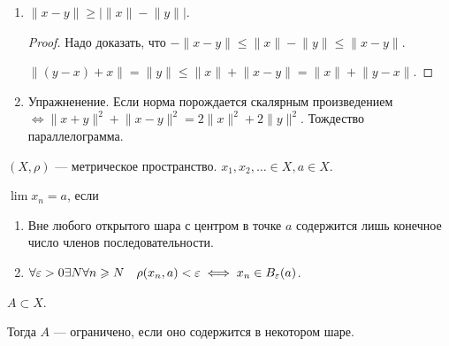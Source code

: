 \begin{properties}
\begin{enumerate}
\begin{proof}
                 $\rho(y, x) = \lVert y-x \rVert = \lVert (-1)(x-y) \rVert = |-1| \lVert x - y \rVert = \rho(x, y)$.

                  $\rho(x, z) \le \rho(x, y) + \rho(y, z)$: $\lVert (x-y) + (y-z) \rVert = \lVert x-z\rVert \le \lVert x - y \rVert + \lVert y-z \rVert$.
            \end{proof}
        \item $\lVert x - y \rVert \ge |\lVert x \rVert - \lVert y \rVert |$.
            \begin{proof}
                Надо доказать, что $-\lVert x - y \rVert \le \lVert x \rVert - \lVert y \rVert \le \lVert x - y \rVert$.

                $\lVert (y-x) + x \rVert = \lVert y \rVert \le \lVert x \rVert + \lVert x-y \rVert = \lVert x \rVert + \lVert y -x \rVert$.
            \end{proof}
        \item Упражненение. Если норма порождается скалярным произведением $\iff \lVert x+y\rVert^2 + \lVert x-y\rVert^2 = 2\lVert x\rVert^2 + 2\lVert y \rVert^2$. Тождество параллелограмма.
    \end{enumerate}
\end{properties}
\begin{definition}
    $(X, \rho)$ --- метрическое пространство.  $x_1, x_2, \ldots \in X, a \in X$.

    $\lim x_n = a$, если
     \begin{enumerate}
         \item Вне любого открытого шара с центром в точке  $a$ содержится лишь конечное число членов последовательности.
         \item  $\forall \varepsilon > 0 \exists N \forall n \geqslant N\quad \rho(x_n, a) < \varepsilon \iff x_n \in B_\varepsilon(a)$.
    \end{enumerate}
\end{definition}
\begin{definition}
    $A \subset X$. 

    Тогда  $A$ --- ограничено, если оно содержится в некотором шаре.
\end{definition}
